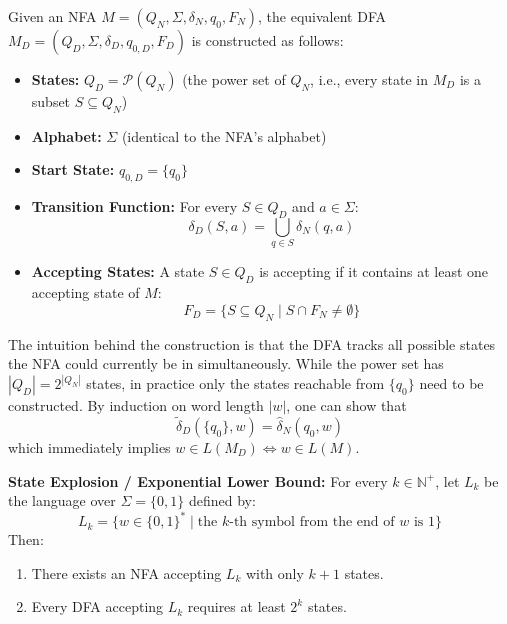\begin{definition}
    Given an NFA $M = (Q_N, \Sigma, \delta_N, q_0, F_N)$, the equivalent DFA
    $M_D = (Q_D, \Sigma, \delta_D, q_{0,D}, F_D)$ is constructed as follows:
    \begin{itemize}
        \item \textbf{States:} $Q_D = \mathcal{P}(Q_N)$ (the power set of $Q_N$,
              i.e., every state in $M_D$ is a subset $S \subseteq Q_N$)
        \item \textbf{Alphabet:} $\Sigma$ (identical to the NFA's alphabet)
        \item \textbf{Start State:} $q_{0,D} = \{q_0\}$
        \item \textbf{Transition Function:} For every $S \in Q_D$ and
              $a \in \Sigma$:
              $$
                  \delta_D(S, a) = \bigcup_{q \in S} \delta_N(q, a)
              $$
        \item \textbf{Accepting States:} A state $S \in Q_D$ is accepting if it
              contains at least one accepting state of $M$:
              $$
                  F_D = \{S \subseteq Q_N \mid S \cap F_N \neq \emptyset\}
              $$
    \end{itemize}
\end{definition}

\begin{remark}
    The intuition behind the construction is that the DFA tracks all possible
    states the NFA could currently be in simultaneously.
    While the power set has $|Q_D| = 2^{|Q_N|}$ states, in practice only the
    states reachable from $\{q_0\}$ need to be constructed.
    By induction on word length $|w|$, one can show that
    $$
        \tilde{\delta}_D(\{q_0\}, w) = \hat{\delta}_N(q_0, w)
    $$
    which immediately implies $w \in L(M_D) \iff w \in L(M)$.
\end{remark}

\begin{theorem}
    \textbf{State Explosion / Exponential Lower Bound:} For every $k \in \mathbb{N}^+$,
    let $L_k$ be the language over $\Sigma = \{0, 1\}$ defined by:
    $$
        L_k = \{ w \in \{0, 1\}^* \mid \text{the } k\text{-th symbol from the end of } w \text{ is } 1 \}
    $$
    Then:
    \begin{enumerate}
        \item There exists an NFA accepting $L_k$ with only $k + 1$ states.
        \item Every DFA accepting $L_k$ requires at least $2^k$ states.
    \end{enumerate}
\end{theorem}

